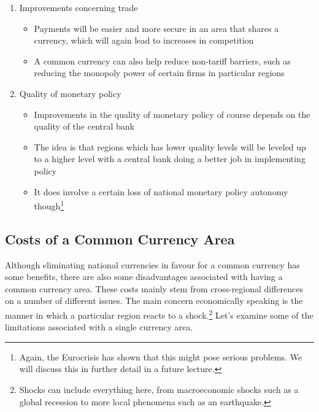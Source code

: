\documentclass{tufte-handout}
\begin{document}
\begin{enumerate}
	\item Improvements concerning trade
	\begin{itemize}
	  \item Payments will be easier and more secure in an area that shares a currency, which will again lead to increases in competition
	  \item A common currency can also help reduce non-tariff barriers, such as reducing the monopoly power of certain firms in particular regions
	\end{itemize} 	

 	\item Quality of monetary policy
 	\begin{itemize}
 	  \item Improvements in the quality of monetary policy of course depends on the quality of the central bank
 	  \item The idea is that regions which has lower quality levels will be leveled up to a higher level with a central bank doing a better job in implementing policy
 	  \item It does involve a certain loss of national monetary policy autonomy though\footnote{Again, the Eurocrisis has shown that this might pose serious problems. We will discuss this in further detail in a future lecture.}
 	\end{itemize} 	 
\end{enumerate}

\subsection{Costs of a Common Currency Area}
Although eliminating national currencies in favour for a common currency has some benefits, there are also some disadvantages associated with having a common currency area. 
These costs mainly stem from cross-regional differences on a number of different issues. 
The main concern economically speaking is the manner in which a particular region reacts to a shock.\footnote{Shocks can include everything here, from macroeconomic shocks such as a global recession to more local phenomena such as an earthquake.} 
Let's examine some of the limitations associated with a single currency area.
\end{document}
